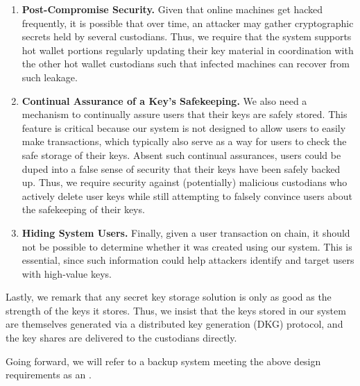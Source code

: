 \begin{enumerate}
\item \textbf{Post-Compromise Security.} Given that online machines get hacked frequently, it is possible that over time, an attacker may gather cryptographic secrets held by several custodians. Thus, we require that the system supports hot wallet portions regularly updating their key material in coordination with the other hot wallet custodians such that infected machines can recover from such leakage. 

\item \textbf{Continual Assurance of a Key's Safekeeping.} We also need a mechanism to continually assure users that their keys are safely stored. This feature is critical because our system is not designed to allow users to easily make transactions, which typically also serve as a way for users to check the safe storage of their keys. Absent such continual assurances, users could be duped into a false sense of security that their keys have been safely backed up. Thus, we require security against (potentially) malicious custodians who actively delete user keys while still attempting to falsely convince users about the safekeeping of their keys. 

\item \textbf{Hiding System Users.} Finally, given a user transaction on chain, it should not be possible to determine whether it was created using our system. This is essential, since such information could help attackers identify and target users with high-value keys. 
\end{enumerate}

Lastly, we remark that any secret key storage solution is only as good as the strength of the keys it stores. Thus, we insist that the keys stored in our system are themselves generated via a distributed key generation (DKG) protocol, and the key shares are delivered to the custodians directly.%

Going forward, we will refer to a backup system meeting the above design requirements as an \emph{\hcwl}.
